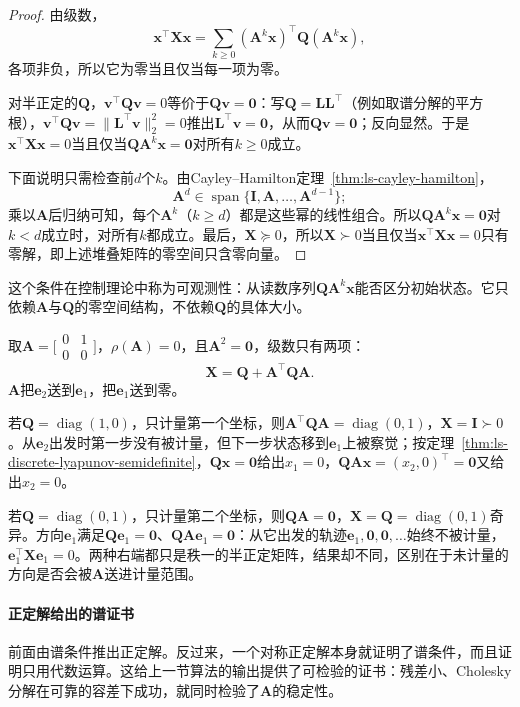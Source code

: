 \begin{proof}
由级数，
\[
 \bm x^\top\bm X\bm x=\sum_{k\geq0}(\bm A^k\bm x)^\top\bm Q(\bm A^k\bm x),
\]
各项非负，所以它为零当且仅当每一项为零。

对半正定的$\bm Q$，$\bm v^\top\bm Q\bm v=0$等价于$\bm Q\bm v=\bm0$：写$\bm Q=\bm L\bm L^\top$（例如取谱分解的平方根），$\bm v^\top\bm Q\bm v=\lVert\bm L^\top\bm v\rVert_2^2=0$推出$\bm L^\top\bm v=\bm0$，从而$\bm Q\bm v=\bm0$；反向显然。于是$\bm x^\top\bm X\bm x=0$当且仅当$\bm Q\bm A^k\bm x=\bm0$对所有$k\geq0$成立。

下面说明只需检查前$d$个$k$。由Cayley--Hamilton定理~\ref{thm:ls-cayley-hamilton}，
\[
 \bm A^d\in\operatorname{span}\{\bm I,\bm A,\ldots,\bm A^{d-1}\};
\]
乘以$\bm A$后归纳可知，每个$\bm A^k$（$k\geq d$）都是这些幂的线性组合。所以$\bm Q\bm A^k\bm x=\bm0$对$k<d$成立时，对所有$k$都成立。最后，$\bm X\succeq0$，所以$\bm X\succ0$当且仅当$\bm x^\top\bm X\bm x=0$只有零解，即上述堆叠矩阵的零空间只含零向量。
\end{proof}

这个条件在控制理论中称为可观测性：从读数序列$\bm Q\bm A^k\bm x$能否区分初始状态。它只依赖$\bm A$与$\bm Q$的零空间结构，不依赖$\bm Q$的具体大小。

\begin{example}[未被累计量察觉的方向]
\label{ex:ls-discrete-lyapunov-unobserved}
取$\bm A=\bigl[\begin{smallmatrix}0&1\\0&0\end{smallmatrix}\bigr]$，$\rho(\bm A)=0$，且$\bm A^2=\bm0$，级数只有两项：
\[
 \bm X=\bm Q+\bm A^\top\bm Q\bm A .
\]$\bm A$把$\bm e_2$送到$\bm e_1$，把$\bm e_1$送到零。

若$\bm Q=\operatorname{diag}(1,0)$，只计量第一个坐标，则$\bm A^\top\bm Q\bm A=\operatorname{diag}(0,1)$，$\bm X=\bm I\succ0$。从$\bm e_2$出发时第一步没有被计量，但下一步状态移到$\bm e_1$上被察觉；按定理~\ref{thm:ls-discrete-lyapunov-semidefinite}，$\bm Q\bm x=\bm0$给出$x_1=0$，$\bm Q\bm A\bm x=(x_2,0)^\top=\bm0$又给出$x_2=0$。

若$\bm Q=\operatorname{diag}(0,1)$，只计量第二个坐标，则$\bm Q\bm A=\bm0$，$\bm X=\bm Q=\operatorname{diag}(0,1)$奇异。方向$\bm e_1$满足$\bm Q\bm e_1=\bm0$、$\bm Q\bm A\bm e_1=\bm0$：从它出发的轨迹$\bm e_1,\bm0,\bm0,\ldots$始终不被计量，$\bm e_1^\top\bm X\bm e_1=0$。两种右端都只是秩一的半正定矩阵，结果却不同，区别在于未计量的方向是否会被$\bm A$送进计量范围。
\end{example}

\paragraph{正定解给出的谱证书}
前面由谱条件推出正定解。反过来，一个对称正定解本身就证明了谱条件，而且证明只用代数运算。这给上一节算法的输出提供了可检验的证书：残差小、Cholesky分解在可靠的容差下成功，就同时检验了$\bm A$的稳定性。


